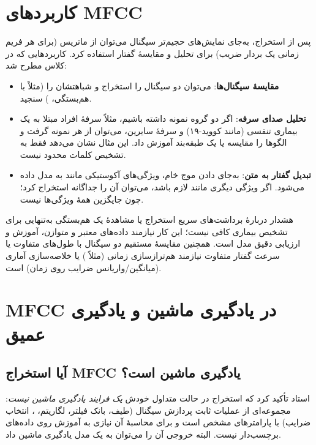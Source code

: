 \section{کاربردهای MFCC}

پس از استخراج، به‌جای نمایش‌های حجیم‌تر سیگنال می‌توان از ماتریس  (برای هر فریم زمانی یک بردار ضریب) برای تحلیل و مقایسهٔ گفتار استفاده کرد. کاربردهایی که در کلاس مطرح شد:
\begin{itemize}
  \item \textbf{مقایسهٔ سیگنال‌ها}: می‌توان  دو سیگنال را استخراج و شباهتشان را (مثلاً با هم‌بستگی، ) سنجید.
  \item \textbf{تحلیل صدای سرفه}: اگر دو گروه نمونه داشته باشیم، مثلاً سرفهٔ افراد مبتلا به یک بیماری تنفسی (مانند کووید-۱۹) و سرفهٔ سایرین، می‌توان از هر نمونه  گرفت و الگوها را مقایسه یا یک طبقه‌بند آموزش داد. این مثال نشان می‌دهد  فقط به تشخیص کلمات محدود نیست.
  \item \textbf{تبدیل گفتار به متن}: به‌جای دادن موج خام، ویژگی‌های آکوستیکی مانند  به مدل داده می‌شود. اگر ویژگی دیگری مانند  لازم باشد، می‌توان آن را جداگانه استخراج کرد؛ چون  جایگزین همهٔ ویژگی‌ها نیست.
\end{itemize}

\begin{warningbox}{هشدار دربارهٔ برداشت‌های سریع}
استخراج  یا مشاهدهٔ یک هم‌بستگی به‌تنهایی برای تشخیص بیماری کافی نیست؛ این کار نیازمند داده‌های معتبر و متوازن، آموزش و ارزیابی دقیق مدل است. همچنین مقایسهٔ مستقیم  دو سیگنال با طول‌های متفاوت یا سرعت گفتار متفاوت نیازمند هم‌ترازسازی زمانی (مثلاً ) یا خلاصه‌سازی آماری (میانگین/واریانس ضرایب روی زمان) است.
\end{warningbox}

\section{MFCC در یادگیری ماشین و یادگیری عمیق}

\subsection{آیا استخراج MFCC یادگیری ماشین است؟}
استاد تأکید کرد که استخراج  در حالت متداول خودش \emph{یک فرایند یادگیری ماشین نیست}: مجموعه‌ای از عملیات ثابت پردازش سیگنال (طیف، بانک فیلتر، لگاریتم، ، انتخاب ضرایب) با پارامترهای مشخص است و برای محاسبهٔ آن نیازی به آموزش روی داده‌های برچسب‌دار نیست. البته خروجی آن را می‌توان به یک مدل یادگیری ماشین داد.

